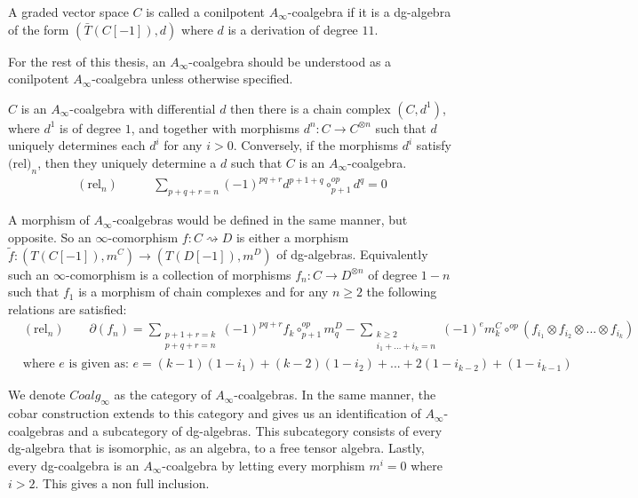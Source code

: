 \documentclass[../thesis.tex]{subfiles}
\begin{document}
        \begin{definition}
            A graded vector space $C$ is called a conilpotent $A_\infty$-coalgebra if it is a dg-algebra of the form $(\bar{T}(C[-1]), d)$ where $d$ is a derivation of degree $11$.
        \end{definition}

        \begin{remark}
            For the rest of this thesis, an $A_\infty$-coalgebra should be understood as a conilpotent $A_\infty$-coalgebra unless otherwise specified.
        \end{remark}

        \begin{corollary}
            $C$ is an $A_\infty$-coalgebra with differential $d$ then there is a chain complex $(C, d^1)$, where $d^1$ is of degree $1$, and together with morphisms $d^n : C \rightarrow C^{\otimes n}$ such that $d$ uniquely determines each $d^i$ for any $i>0$. Conversely, if the morphisms $d^i$ satisfy $\text{(rel)}_n$, then they uniquely determine a $d$ such that $C$ is an $A_\infty$-coalgebra.
            \begin{align*}
                (\text{rel}_n)\qquad & \sum_{p+q+r = n}(-1)^{pq+r}d^{p+1+q}\circ^{op}_{p+1}d^q = 0
            \end{align*}
        \end{corollary}

        A morphism of $A_\infty$-coalgebras would be defined in the same manner, but opposite. So an $\infty$-comorphism $f: C \rightsquigarrow D$ is either a morphism $\widetilde{f}: (T(C[-1]), m^C) \rightarrow (T(D[-1]),m^D)$ of dg-algebras. Equivalently such an $\infty$-comorphism is a collection of morphisms $f_n : C \rightarrow D^{\otimes n}$ of degree $1-n$ such that $f_1$ is a morphism of chain complexes and for any $n\geq 2$ the following relations are satisfied:
        \begin{align*}
            & (\text{rel}_n)\qquad \partial(f_n) = \sum_{\substack{p + 1 + r = k \\ p + q + r = n}}(-1)^{pq+r}f_k\circ^{op}_{p+1}m^D_q - \sum_{\substack{k\geq 2 \\ i_1 + ... + i_k = n}}(-1)^{e}m^C_k \circ^{op} (f_{i_1}\otimes f_{i_2}\otimes ... \otimes f_{i_k}) \\
            & \text{where } e \text{ is given as: } e = (k-1)(1-i_1) + (k-2)(1-i_2) + ... + 2(1-i_{k-2}) + (1-i_{k-1})
        \end{align*}

        We denote $Coalg_\infty$ as the category of $A_\infty$-coalgebras. In the same manner, the cobar construction extends to this category and gives us an identification of $A_\infty$-coalgebras and a subcategory of dg-algebras. This subcategory consists of every dg-algebra that is isomorphic, as an algebra, to a free tensor algebra. Lastly, every dg-coalgebra is an $A_\infty$-coalgebra by letting every morphism $m^i = 0$ where $i>2$. This gives a non full inclusion. 
\end{document}
